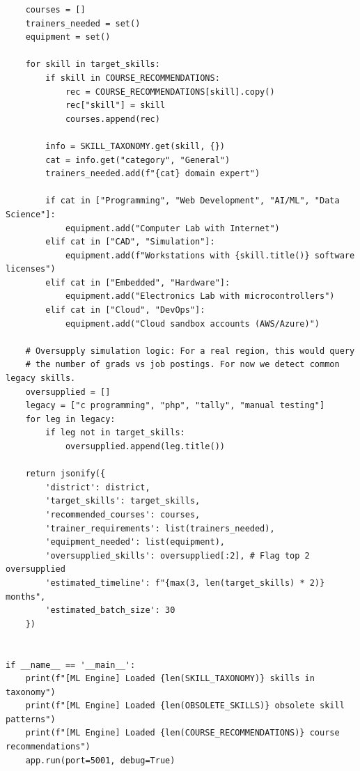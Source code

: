 \documentclass[12pt,a4paper]{report}
\begin{document}
\begin{verbatim}
    courses = []
    trainers_needed = set()
    equipment = set()

    for skill in target_skills:
        if skill in COURSE_RECOMMENDATIONS:
            rec = COURSE_RECOMMENDATIONS[skill].copy()
            rec["skill"] = skill
            courses.append(rec)

        info = SKILL_TAXONOMY.get(skill, {})
        cat = info.get("category", "General")
        trainers_needed.add(f"{cat} domain expert")

        if cat in ["Programming", "Web Development", "AI/ML", "Data Science"]:
            equipment.add("Computer Lab with Internet")
        elif cat in ["CAD", "Simulation"]:
            equipment.add(f"Workstations with {skill.title()} software licenses")
        elif cat in ["Embedded", "Hardware"]:
            equipment.add("Electronics Lab with microcontrollers")
        elif cat in ["Cloud", "DevOps"]:
            equipment.add("Cloud sandbox accounts (AWS/Azure)")
            
    # Oversupply simulation logic: For a real region, this would query
    # the number of grads vs job postings. For now we detect common legacy skills.
    oversupplied = []
    legacy = ["c programming", "php", "tally", "manual testing"]
    for leg in legacy:
        if leg not in target_skills:
            oversupplied.append(leg.title())

    return jsonify({
        'district': district,
        'target_skills': target_skills,
        'recommended_courses': courses,
        'trainer_requirements': list(trainers_needed),
        'equipment_needed': list(equipment),
        'oversupplied_skills': oversupplied[:2], # Flag top 2 oversupplied
        'estimated_timeline': f"{max(3, len(target_skills) * 2)} months",
        'estimated_batch_size': 30
    })


if __name__ == '__main__':
    print(f"[ML Engine] Loaded {len(SKILL_TAXONOMY)} skills in taxonomy")
    print(f"[ML Engine] Loaded {len(OBSOLETE_SKILLS)} obsolete skill patterns")
    print(f"[ML Engine] Loaded {len(COURSE_RECOMMENDATIONS)} course recommendations")
    app.run(port=5001, debug=True)

\end{verbatim}
\end{document}
